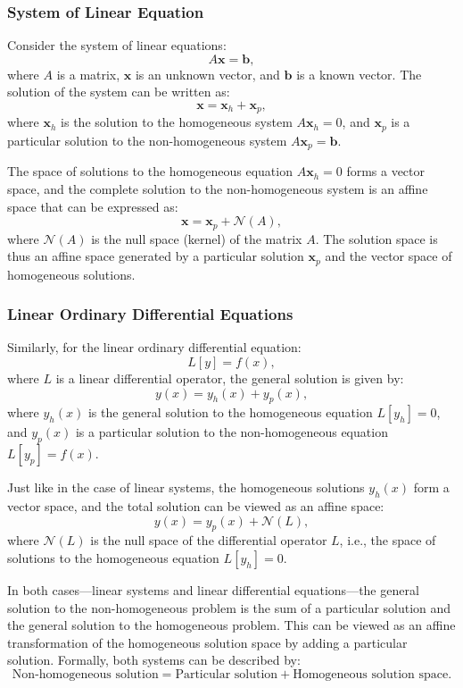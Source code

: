 \documentclass[12pt,a4paper]{article}
\begin{document}
\begin{remark}
\subsubsection*{System of Linear Equation}
Consider the system of linear equations:
\[
A \mathbf{x} = \mathbf{b},
\]
where \( A \) is a matrix, \( \mathbf{x} \) is an unknown vector, and \( \mathbf{b} \) is a known vector. The solution of the system can be written as:
\[
\mathbf{x} = \mathbf{x}_h + \mathbf{x}_p,
\]
where \( \mathbf{x}_h \) is the solution to the homogeneous system \( A \mathbf{x}_h = 0 \), and \( \mathbf{x}_p \) is a particular solution to the non-homogeneous system \( A \mathbf{x}_p = \mathbf{b} \).

The space of solutions to the homogeneous equation \( A \mathbf{x}_h = 0 \) forms a vector space, and the complete solution to the non-homogeneous system is an affine space that can be expressed as:
\[
\mathbf{x} = \mathbf{x}_p + \mathcal{N}(A),
\]
where \( \mathcal{N}(A) \) is the null space (kernel) of the matrix \( A \). The solution space is thus an affine space generated by a particular solution \( \mathbf{x}_p \) and the vector space of homogeneous solutions.

\medskip

\subsubsection*{Linear Ordinary Differential Equations}

Similarly, for the linear ordinary differential equation:
\[
L[y] = f(x),
\]
where \( L \) is a linear differential operator, the general solution is given by:
\[
y(x) = y_h(x) + y_p(x),
\]
where \( y_h(x) \) is the general solution to the homogeneous equation \( L[y_h] = 0 \), and \( y_p(x) \) is a particular solution to the non-homogeneous equation \( L[y_p] = f(x) \).

Just like in the case of linear systems, the homogeneous solutions \( y_h(x) \) form a vector space, and the total solution can be viewed as an affine space:
\[
y(x) = y_p(x) + \mathcal{N}(L),
\]
where \( \mathcal{N}(L) \) is the null space of the differential operator \( L \), i.e., the space of solutions to the homogeneous equation \( L[y_h] = 0 \).

In both cases—linear systems and linear differential equations—the general solution to the non-homogeneous problem is the sum of a particular solution and the general solution to the homogeneous problem. This can be viewed as an affine transformation of the homogeneous solution space by adding a particular solution. Formally, both systems can be described by:
\[
\text{Non-homogeneous solution} = \text{Particular solution} + \text{Homogeneous solution space}.
\]


\end{remark}
\end{document}

